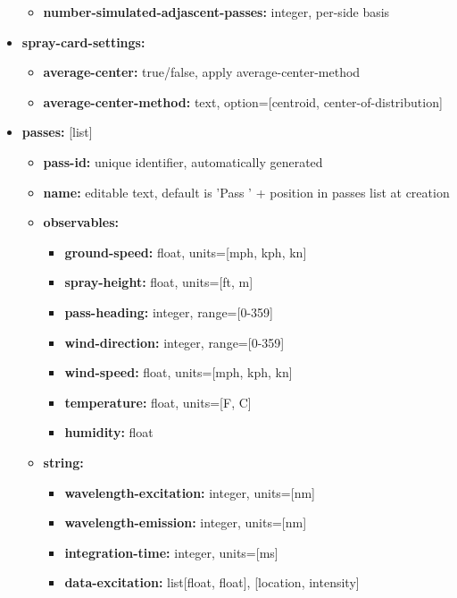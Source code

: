\documentclass[10pt,letterpaper,titlepage]{article}
\begin{document}
\begin{itemize}
\begin{itemize}
            \item \textbf{number-simulated-adjascent-passes:} integer, per-side basis
        \end{itemize}
        \item \textbf{spray-card-settings:} 
        \begin{itemize}
            \item \textbf{average-center:} true/false, apply average-center-method
            \item \textbf{average-center-method:} text, option=[centroid, center-of-distribution]
        \end{itemize}
        \item \textbf{passes:} [list]
        \begin{itemize}
            \item \textbf{pass-id:} unique identifier, automatically generated
            \item \textbf{name:} editable text, default is 'Pass ' + position in passes list at creation
            \item \textbf{observables:} 
            \begin{itemize}
                \item \textbf{ground-speed:} float, units=[mph, kph, kn]
                \item \textbf{spray-height:} float, units=[ft, m]
                \item \textbf{pass-heading:} integer, range=[0-359]
                \item \textbf{wind-direction:} integer, range=[0-359]
                \item \textbf{wind-speed:} float, units=[mph, kph, kn]
                \item \textbf{temperature:} float, units=[\degree F, \degree C]
                \item \textbf{humidity:} float
            \end{itemize}
            \item \textbf{string:} 
            \begin{itemize}
                \item \textbf{wavelength-excitation:} integer, units=[nm]
                \item \textbf{wavelength-emission:} integer, units=[nm]
                \item \textbf{integration-time:} integer, units=[ms]
                \item \textbf{data-excitation:} list[float, float], [location, intensity]

\end{itemize}
\end{itemize}
\end{itemize}
\end{document}
